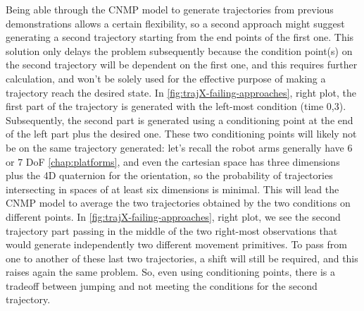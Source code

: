 Being able through the CNMP model to generate trajectories from previous demonstrations allows a certain flexibility, so a second approach might suggest generating a second trajectory starting from the end points of the first one. This solution only delays the problem subsequently because the condition point(s) on the second trajectory will be dependent on the first one, and this requires further calculation, and won't be solely used for the effective purpose of making a trajectory reach the desired state. In \cref{fig:trajX-failing-approaches}, right plot, the first part of the trajectory is generated with the left-most condition (time 0,3). Subsequently, the second part is generated using a conditioning point at the end of the left part plus the desired one. These two conditioning points will likely not be on the same trajectory generated: let's recall the robot arms generally have 6 or 7 DoF \cref{chap:platforms}, and even the cartesian space has three dimensions plus the 4D quaternion for the orientation, so the probability of trajectories intersecting in spaces of at least six dimensions is minimal. This will lead the CNMP model to average the two trajectories obtained by the two conditions on different points. In \cref{fig:trajX-failing-approaches}, right plot, we see the second trajectory part passing in the middle of the two right-most observations that would generate independently two different movement primitives. To pass from one to another of these last two trajectories, a shift will still be required, and this raises again the same problem. 
So, even using conditioning points, there is a tradeoff between jumping and not meeting the conditions for the second trajectory.

